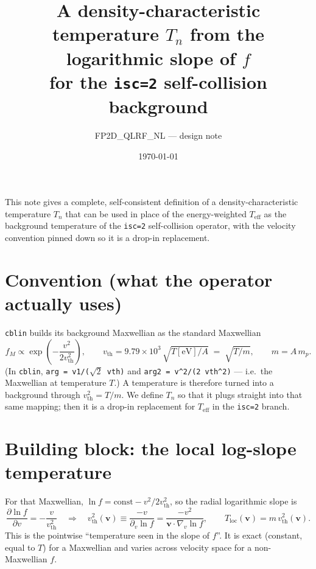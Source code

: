 \documentclass[11pt,a4paper]{article}
\title{A density-characteristic temperature $T_n$ from the logarithmic
  slope of $f$\\ for the \texttt{isc=2} self-collision background}
\author{FP2D\_QLRF\_NL --- design note}
\date{\today}
\begin{document}
\maketitle

This note gives a complete, self-consistent definition of a
density-characteristic temperature $T_n$ that can be used in place of the
energy-weighted $T_\mathrm{eff}$ as the background temperature of the
\texttt{isc=2} self-collision operator, with the velocity convention pinned
down so it is a drop-in replacement.

\section{Convention (what the operator actually uses)}

\texttt{cblin} builds its background Maxwellian as the standard Maxwellian
\begin{equation}
  f_M \propto \exp\!\left(-\frac{v^2}{2v_\mathrm{th}^2}\right),
  \qquad
  v_\mathrm{th} = 9.79\times10^3\,\sqrt{T[\mathrm{eV}]/A}\;=\;\sqrt{T/m},
  \qquad m = A\,m_p .
\end{equation}
(In \texttt{cblin}, \texttt{arg = v1/($\sqrt2$\,vth)} and
\texttt{arg2 = v\textasciicircum2/(2\,vth\textasciicircum2)} --- i.e.\ the
Maxwellian at temperature $T$.) A temperature is therefore turned into a
background through $v_\mathrm{th}^2 = T/m$. We define $T_n$ so that it plugs
straight into that same mapping; then it is a drop-in replacement for
$T_\mathrm{eff}$ in the \texttt{isc=2} branch.

\section{Building block: the local log-slope temperature}

For that Maxwellian, $\ln f = \mathrm{const} - v^2/2v_\mathrm{th}^2$, so the
radial logarithmic slope is
\begin{equation}
  \frac{\partial \ln f}{\partial v} = -\frac{v}{v_\mathrm{th}^2}
  \quad\Longrightarrow\quad
  v_\mathrm{th}^2(\mathbf v) \equiv \frac{-v}{\partial_v \ln f}
  = \frac{-v^2}{\mathbf v\cdot\nabla_v \ln f},
  \qquad
  T_\mathrm{loc}(\mathbf v) = m\,v_\mathrm{th}^2(\mathbf v).
\end{equation}
This is the pointwise ``temperature seen in the slope of $f$''. It is exact
(constant, equal to $T$) for a Maxwellian and varies across velocity space for
a non-Maxwellian $f$.
\end{document}

